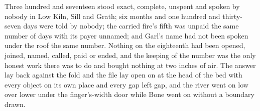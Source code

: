 Three hundred and seventeen stood exact, complete, unspent and spoken by nobody in Low Kiln, Sill and Grath; six months and one hundred and thirty-seven days were told by nobody; the carried fire's fifth was unpaid the same number of days with its payer unnamed; and Garl's name had not been spoken under the roof the same number. Nothing on the eighteenth had been opened, joined, named, called, paid or ended, and the keeping of the number was the only honest work there was to do and bought nothing at two inches of air. The answer lay back against the fold and the file lay open on  at the head of the bed with every object on its own place and every gap left gap, and the river went on low over lower under the finger's-width door while Bone went on without a boundary drawn.
